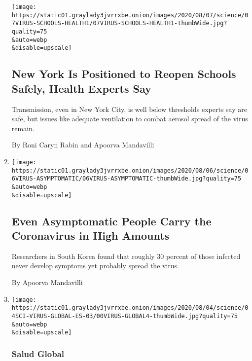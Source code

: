 \begin{enumerate}
  \texttt{[image: https://static01.graylady3jvrrxbe.onion/images/2020/08/07/science/07VIRUS-SCHOOLS-HEALTH1/07VIRUS-SCHOOLS-HEALTH1-thumbWide.jpg?quality=75\\\&auto=webp\\\&disable=upscale]}

  \hypertarget{new-york-is-positioned-to-reopen-schools-safely-health-experts-say}{%
  \subsection{New York Is Positioned to Reopen Schools Safely, Health
  Experts
  Say}\label{new-york-is-positioned-to-reopen-schools-safely-health-experts-say}}

  Transmission, even in New York City, is well below thresholds experts
  say are safe, but issues like adequate ventilation to combat aerosol
  spread of the virus remain.

  By Roni Caryn Rabin and Apoorva Mandavilli
\item
  \href{/2020/08/06/health/coronavirus-asymptomatic-transmission.html}{}

  \texttt{[image: https://static01.graylady3jvrrxbe.onion/images/2020/08/06/science/06VIRUS-ASYMPTOMATIC/06VIRUS-ASYMPTOMATIC-thumbWide.jpg?quality=75\\\&auto=webp\\\&disable=upscale]}

  \hypertarget{even-asymptomatic-people-carry-the-coronavirus-in-high-amounts}{%
  \subsection{Even Asymptomatic People Carry the Coronavirus in High
  Amounts}\label{even-asymptomatic-people-carry-the-coronavirus-in-high-amounts}}

  Researchers in South Korea found that roughly 30 percent of those
  infected never develop symptoms yet probably spread the virus.

  By Apoorva Mandavilli
\item
  \href{/es/2020/08/05/espanol/ciencia-y-tecnologia/tuberculosis-malaria-coronavirus.html}{}

  \texttt{[image: https://static01.graylady3jvrrxbe.onion/images/2020/08/04/science/04SCI-VIRUS-GLOBAL-ES-03/00VIRUS-GLOBAL4-thumbWide.jpg?quality=75\\\&auto=webp\\\&disable=upscale]}

  \hypertarget{salud-global}{%
  \subsubsection{Salud Global}\label{salud-global}}


\end{enumerate}
